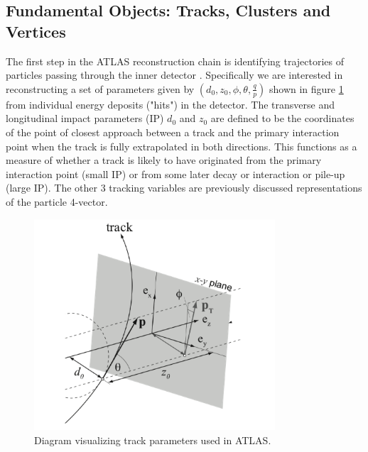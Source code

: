 \subsection{Fundamental Objects: Tracks, Clusters and Vertices}

The first step in the ATLAS reconstruction chain is identifying trajectories of particles passing through the 
inner detector \cite{cornelissen-tracking}. Specifically we are interested in reconstructing a set of parameters 
given by $(d_0, z_0, \phi, \theta, \frac{q}{p})$ shown in figure \ref{fig:Impact_Parameters} from individual energy 
deposits ("hits") in the detector. The transverse and longitudinal impact parameters (IP) $d_0$ and $z_0$ are 
defined to be the coordinates of the point of closest approach between a track and the primary interaction point 
when the track is fully extrapolated in both directions. This functions as a measure of whether a track is likely 
to have originated from the primary interaction point (small IP) or from some later decay or interaction or pile-up 
(large IP). The other 3 tracking variables are previously discussed representations of the particle 4-vector. \par

\begin{figure}
\centering
    \includegraphics[width=0.8\textwidth]{images/Impact_Parameters.png}
    \caption{Diagram visualizing track parameters used in ATLAS.}
    \label{fig:Impact_Parameters}
\end{figure}

